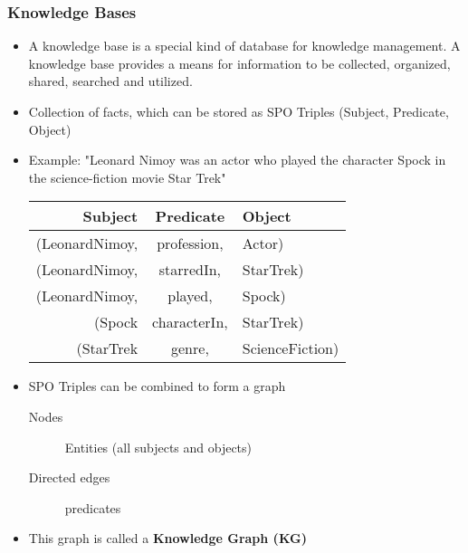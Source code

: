 	\subsubsection{Knowledge Bases}
		\begin{itemize}
			\item A knowledge base is a special kind of database for knowledge management. A knowledge base provides a means for information to be collected, organized, shared, searched and utilized.
			\item Collection of facts, which can be stored as SPO Triples (Subject, Predicate, Object)
			\item Example: "Leonard Nimoy was an actor who played the character Spock in the science-fiction movie Star Trek"
				\begin{table}[H]
					\centering
					\begin{tabular}{r | c | l}
						\textbf{Subject} & \textbf{Predicate} & \textbf{Object} \\ \hline
						(LeonardNimoy,   & profession,        & Actor)          \\
						(LeonardNimoy,   & starredIn,         & StarTrek)       \\
						(LeonardNimoy,   & played,            & Spock)          \\
						(Spock           & characterIn,       & StarTrek)       \\
						(StarTrek        & genre,             & ScienceFiction) \\
					\end{tabular}
				\end{table}
			\item SPO Triples can be combined to form a graph
				\begin{description}
					\item[Nodes] Entities (all subjects and objects)
					\item[Directed edges] predicates
				\end{description}
			\item This graph is called a \textbf{Knowledge Graph (KG)}
		\end{itemize}

